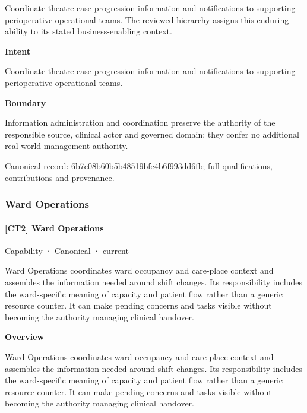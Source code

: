 Coordinate theatre case progression information and notifications to supporting perioperative operational teams. The reviewed hierarchy assigns this enduring ability to its stated business-enabling context.



\textbf{Intent}



Coordinate theatre case progression information and notifications to supporting perioperative operational teams.



\textbf{Boundary}



Information administration and coordination preserve the authority of the responsible source, clinical actor and governed domain; they confer no additional real-world management authority.


{\footnotesize \href{../../../../continuum/strategy/capability/6b7c08b60b5b48519bfe4b6f993dd6fb.md}{Canonical record: 6b7c08b60b5b48519bfe4b6f993dd6fb}; full qualifications, contributions and provenance.}\par
\subsubsection{Ward Operations}

\paragraph{[CT2] Ward Operations}

\label{element:f996ecca728f4942a88b034aca818a99}
{\small Capability · Canonical · current}\par

Ward Operations coordinates ward occupancy and care-place context and assembles the information needed around shift changes. Its responsibility includes the ward-specific meaning of capacity and patient flow rather than a generic resource counter. It can make pending concerns and tasks visible without becoming the authority managing clinical handover.



\textbf{Overview}



Ward Operations coordinates ward occupancy and care-place context and assembles the information needed around shift changes. Its responsibility includes the ward-specific meaning of capacity and patient flow rather than a generic resource counter. It can make pending concerns and tasks visible without becoming the authority managing clinical handover.




